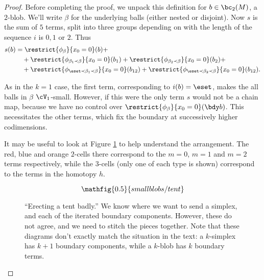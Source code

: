 \begin{proof}
Before completing the proof, we unpack this definition for $b \in \bc_2(M)$, a $2$-blob. We'll write $\beta$ for the underlying balls (either nested or disjoint).
Now $s$ is the sum of $5$ terms, split into three groups depending on with the length of the sequence $i$ is $0, 1$ or $2$. Thus
\begin{align*}
s(b) & = \restrict{\phi_{\beta}}{x_0 = 0}(b) + \\
	& \quad + \restrict{\phi_{\beta_1 \prec \beta}}{x_0 = 0}(b_1) + \restrict{\phi_{\beta_2 \prec \beta}}{x_0 = 0}(b_2) + \\
	& \quad + \restrict{\phi_{\eset \prec \beta_1 \prec \beta}}{x_0 = 0}(b_{12}) + \restrict{\phi_{\eset \prec \beta_2 \prec \beta}}{x_0 = 0}(b_{12}).
\end{align*}

As in the $k=1$ case, the first term, corresponding to $i(b) = \eset$, makes the all balls in $\beta$ $\cV_1$-small. However, if this were the only term $s$ would not be a chain map, because we have no control over $\restrict{\phi_{\beta}}{x_0 = 0}(\bdy b)$. This necessitates the other terms, which fix the boundary at successively higher codimensions.

It may be useful to look at Figure \ref{fig:erectly-a-tent-badly} to help understand the arrangement. The red, blue and orange $2$-cells there correspond to the $m=0$, $m=1$ and $m=2$ terms respectively, while the $3$-cells (only one of each type is shown) correspond to the terms in the homotopy $h$.
\begin{figure}[!ht]
$$\mathfig{0.5}{smallblobs/tent}$$
\caption{``Erecting a tent badly.'' We know where we want to send a simplex, and each of the iterated boundary components. However, these do not agree, and we need to stitch the pieces together. Note that these diagrams don't exactly match the situation in the text: a $k$-simplex has $k+1$ boundary components, while a $k$-blob has $k$ boundary terms.}
\label{fig:erectly-a-tent-badly}
\end{figure}


\end{proof}
